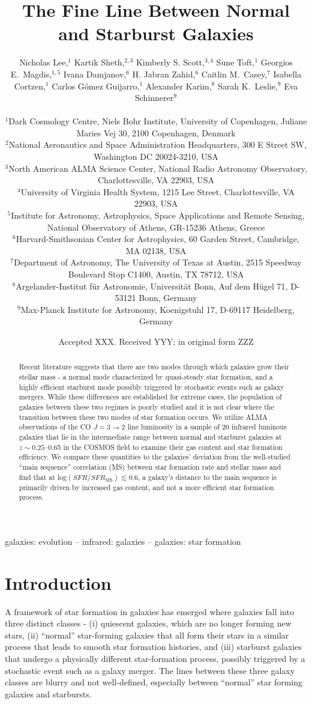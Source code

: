 \documentclass[a4paper,fleqn,usenatbib]{mnras}
\title[]{The Fine Line Between Normal and Starburst Galaxies}
\author[N. Lee et al.]{Nicholas Lee,$^{1}$ Kartik Sheth,$^{2,3}$ Kimberly S. Scott,$^{3,4}$ Sune Toft,$^{1}$  
\newauthor Georgios E.\ Magdis,$^{1, 5}$ Ivana Damjanov,$^{6}$ H. Jabran Zahid,$^{6}$ Caitlin M.\ Casey,$^{7}$ 
\newauthor Isabella Cortzen,$^{1}$ Carlos G\'omez Guijarro,$^{1}$ Alexander Karim,$^{8}$ Sarah K.\ Leslie,$^{9}$ 
\newauthor Eva Schinnerer$^{9}$
\\
\\
$^{1}$Dark Cosmology Centre, Niels Bohr Institute, University of Copenhagen, Juliane Maries Vej 30, 2100 Copenhagen, Denmark\\
$^{2}$National  Aeronautics and Space Administration Headquarters, 300 E Street SW, Washington DC 20024-3210, USA\\
$^{3}$North American ALMA Science Center, National Radio Astronomy Observatory, Charlottesville, VA 22903, USA\\
$^{4}$University of Virginia Health System, 1215 Lee Street, Charlottesville, VA 22903, USA\\
$^{5}$Institute for Astronomy, Astrophysics, Space Applications and Remote Sensing, National Observatory of Athens, GR-15236 Athens, Greece\\
$^{6}$Harvard-Smithsonian Center for Astrophysics, 60 Garden Street, Cambridge, MA 02138, USA\\
$^{7}$Department of Astronomy, The University of Texas at Austin, 2515 Speedway Boulevard Stop C1400, Austin, TX 78712, USA\\
$^{8}$Argelander-Institut f\"{u}r Astronomie, Universit\"{a}t Bonn, Auf dem H\"{u}gel 71, D-53121 Bonn, Germany\\
$^{9}$Max-Planck Institute for Astronomy, Koenigstuhl 17, D-69117 Heidelberg, Germany
}
\date{Accepted XXX. Received YYY; in original form ZZZ}
\begin{document}
\label{firstpage}
\pagerange{\pageref{firstpage}--\pageref{lastpage}}
\maketitle

\begin{abstract}
Recent literature suggests that there are two modes through which galaxies grow their stellar mass -  a normal mode characterized by quasi-steady star formation, and a highly efficient starburst mode possibly triggered by stochastic events such as galaxy mergers. While these differences are established for extreme cases, the population of galaxies between these two regimes is poorly studied and it is not clear where the transition between these two modes of star formation occurs. We utilize ALMA observations of the CO $J=3\rightarrow2$ line luminosity in a sample of 20 infrared luminous galaxies that lie in the intermediate range between normal and starburst galaxies at $z \sim 0.25$--0.65 in the COSMOS field to examine their gas content and star formation efficiency.  We compare these quantities to the galaxies' deviation from the well-studied ``main sequence'' correlation (MS) between star formation rate and stellar mass and find that at log$(SFR/SFR_{\mathrm{MS}}) \lesssim 0.6$, a galaxy's distance to the main sequence is primarily driven by increased gas content, and not a more efficient  star formation process.  
\end{abstract}

\begin{keywords}
galaxies: evolution -- infrared: galaxies -- galaxies: star formation
\end{keywords}



\section{Introduction}
A framework of star formation in galaxies has emerged where galaxies fall into three distinct classes - (i) quiescent galaxies, which are no longer forming new stars, (ii) ``normal'' star-forming galaxies that all form their stars in a similar process that leads to smooth star formation histories, and (iii) starburst galaxies that undergo a physically different star-formation process, possibly triggered by a stochastic event such as a galaxy merger. The lines between these three galaxy classes are blurry and not well-defined, especially between ``normal'' star forming galaxies and starbursts. 
\end{document}
